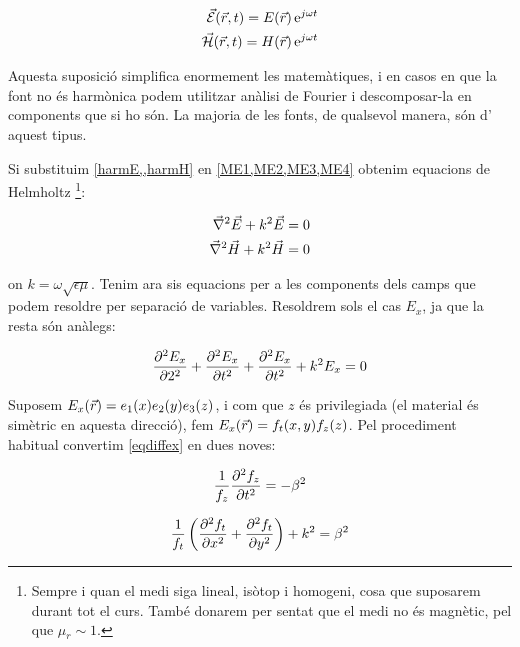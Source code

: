 \begin{subequations}
  \begin{align}
    \rfield E \rtfun = E\rfun\e{\jmath \omega t} \label{harmE}\\
    \rfield H \rtfun = H\rfun\e{\jmath \omega t} \label{harmH}
  \end{align}
\end{subequations}

Aquesta suposició simplifica enormement les matemàtiques, i en casos en que la font no és harmònica  podem utilitzar anàlisi de Fourier i descomposar-la en components que si ho són. La majoria de les fonts, de qualsevol manera, són d' aquest tipus.

Si substituim \cref{harmE,,harmH} en \cref{ME1,ME2,ME3,ME4} obtenim equacions de Helmholtz \footnote{Sempre i quan el medi siga lineal, isòtop i homogeni, cosa que suposarem durant tot el curs. També donarem per sentat que el medi no és magnètic, pel que $\mu{}_r  \sim 1$.}:

\begin{subequations}
    \label{helm}
  \begin{align}
    \del ^2 \vec E + k^2 \vec E &= 0 \\
    \del ^2 \vec H + k^2 \vec H &= 0 
  \end{align}
\end{subequations}

on $k = \omega \sqrt{\epsilon \mu} \nonumber$. Tenim ara sis equacions per a les components dels camps que podem resoldre per separació de variables. Resoldrem sols el cas $E_x$, ja que la resta són anàlegs:

\begin{equation}
  \label{eqdiffex}
  \pd[2]{E_x}{2} + \pd[2]{E_x}{t} + \pd[2]{E_x}{t} + k^2 E_x = 0
\end{equation}

Suposem $E_x \rfun = e_1(x)e_2(y)e_3(z)$, i com que $z$ és privilegiada (el material és simètric en aquesta direcció), fem $ E_x \rfun = f_t(x, y) f_z(z)$. Pel procediment habitual convertim \cref{eqdiffex} en dues noves:

\begin{equation}
  \frac{1}{f_z}\pd[2]{f_z}{t} = - \beta ^2
\end{equation}

\begin{equation}
  \frac{1}{f_t} \left(\pd[2]{f_t}{x} + \pd[2]{f_t}{y} \right ) + k^2 = \beta ^2
\end{equation}

